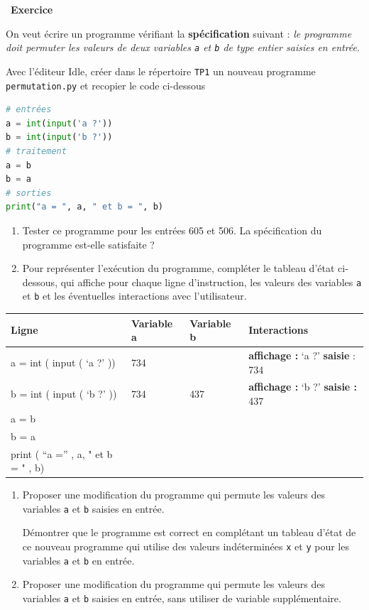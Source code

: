 \documentclass[
  11pt,
]{article}
\newcommand{\passthrough}[1]{#1}
\providecommand{\tightlist}{%
  \setlength{\itemsep}{0pt}\setlength{\parskip}{0pt}}
\newcounter{exo}
\newenvironment{exercice}[1]
{\par \medskip   \addtocounter{exo}{1} \noindent  
\begin{bclogo}[arrondi =0.1,   noborder = true, logo=\bccrayon, marge=4]{~\textbf{Exercice} \textbf{\theexo} {\itshape #1} }  \par}
{
\end{bclogo}
 \par \bigskip }
\newcounter{def}
\newcounter{prog}
\begin{document}
\begin{exercice}{}

On veut écrire un programme vérifiant la \textbf{spécification} suivant
: \emph{le programme doit permuter les valeurs de deux variables
\passthrough{\lstinline!a!} et \passthrough{\lstinline!b!} de type
entier saisies en entrée}.

Avec l'éditeur Idle, créer dans le répertoire
\passthrough{\lstinline!TP1!} un nouveau programme
\passthrough{\lstinline!permutation.py!} et recopier le code ci-dessous

\begin{lstlisting}[language=Python]
# entrées
a = int(input('a ?'))
b = int(input('b ?'))
# traitement
a = b
b = a 
# sorties
print("a = ", a, " et b = ", b)
\end{lstlisting}

\begin{enumerate}
\def\labelenumi{\arabic{enumi}.}
\tightlist
\item
  Tester ce programme pour les entrées 605 et 506. La spécification du
  programme est-elle satisfaite ?
\item
  Pour représenter l'exécution du programme, compléter le tableau d'état
  ci-dessous, qui affiche pour chaque ligne d'instruction, les valeurs
  des variables \passthrough{\lstinline!a!} et
  \passthrough{\lstinline!b!} et les éventuelles interactions avec
  l'utilisateur.
\end{enumerate}

\begin{longtable}[]{@{}llll@{}}
\toprule
Ligne & Variable a & Variable b & Interactions\tabularnewline
\midrule
\endhead
a = int ( input ( `a ?' )) & 734 & & \textbf{affichage :} `a ?'
\textbf{saisie} : 734\tabularnewline
b = int ( input ( `b ?' )) & 734 & 437 & \textbf{affichage :} `b ?'
\textbf{saisie :} 437\tabularnewline
a = b & & &\tabularnewline
b = a & & &\tabularnewline
print ( ``a ='' , a, " et b = " , b) & & &\tabularnewline
\bottomrule
\end{longtable}

\begin{enumerate}
\def\labelenumi{\arabic{enumi}.}
\item
  Proposer une modification du programme qui permute les valeurs des
  variables \passthrough{\lstinline!a!} et \passthrough{\lstinline!b!}
  saisies en entrée.

  Démontrer que le programme est correct en complétant un tableau d'état
  de ce nouveau programme qui utilise des valeurs indéterminées
  \passthrough{\lstinline!x!} et \passthrough{\lstinline!y!} pour les
  variables \passthrough{\lstinline!a!} et \passthrough{\lstinline!b!}
  en entrée.
\item
  Proposer une modification du programme qui permute les valeurs des
  variables \passthrough{\lstinline!a!} et \passthrough{\lstinline!b!}
  saisies en entrée, sans utiliser de variable supplémentaire.
\end{enumerate}

\end{exercice}
\end{document}
